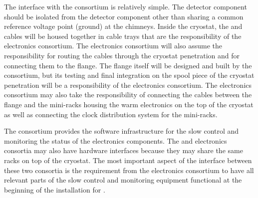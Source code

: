 The interface with the  consortium is relatively simple.
The  detector component should be isolated from the 
detector component other than sharing a common reference 
voltage point (ground) at the chimneys. Inside the cryostat, the 
 and  cables will be housed together in
cable trays that are the responsibility of the  electronics
consortium. The  electronics consortium will also assume
the responsibility for routing the  cables through the
cryostat penetration and for connecting them to the 
flange. The flange itself will be designed and built by the 
consortium, but its testing and final integration on the spool piece
of the cryostat penetration will be a responsibility of the  electronics
consortium. The  electronics consortium may also
take the responsibility of connecting the 
 cables between the flange and the mini-racks housing
the  warm electronics on the top of the cryostat as
well as connecting the clock distribution system for the mini-racks.

The  consortium provides the software infrastructure for the slow
control and monitoring the status of the  electronics components.
The  and  electronics consortia may also have hardware
interfaces because they may share the same racks on top of the
cryostat. The most important aspect of the interface between these
two consortia is the requirement from the  electronics consortium
to have all relevant parts of the slow control and monitoring
equipment functional at the beginning
of the installation for . 
